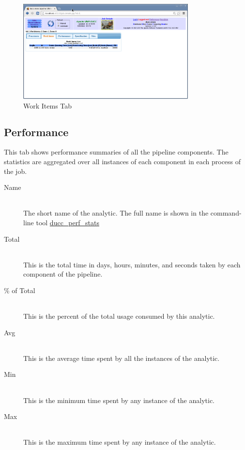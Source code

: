     \begin{figure}[ht!]
    \centering
    \includegraphics[width=90mm]{images/ducc-webserver/Job-Details-WorkItems.png}
    \caption{Work Items Tab}
    \end{figure}  

   \subsection{Performance}
   \label{subsec:performance}
   This tab shows performance summaries of all the pipeline components.  The statistics
   are aggregated over all instances of each component in each process of the job.
   
   \begin{description}
     \item[Name]  \hfill \\
       The short name of the analytic.  The full name is shown in the command-line
       tool \hyperref[sec:cli.ducc-perf-stats]{ducc\_perf\_stats}
     \item[Total]  \hfill \\
       This is the total time in days, hours, minutes, and seconds taken by each
       component of the pipeline.
     \item[\% of Total]  \hfill \\
       This is the percent of the total usage consumed by this analytic.
     \item[Avg]  \hfill \\
       This is the average time spent by all the instances of the analytic.
     \item[Min]  \hfill \\
       This is the minimum time spent by any instance of the analytic.
     \item[Max]  \hfill \\
       This is the maximum time spent by any instance of the analytic.
   \end{description}
    
